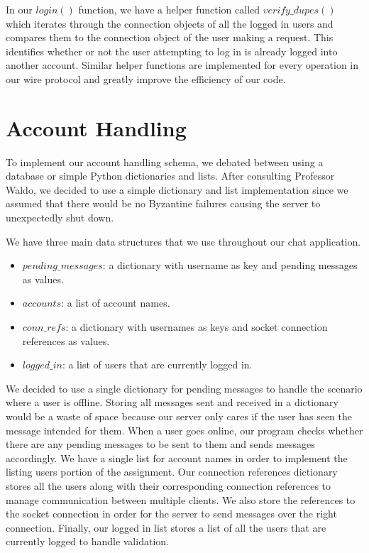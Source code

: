\documentclass[
	a4paper, %
	10pt, %
	unnumberedsections, %
	twoside, %
]{LTJournalArticle}
\begin{document}
In our $login()$ function, we have a helper function called $verify\_dupes()$ which iterates through the connection objects of all the logged in users and compares them to the connection object of the user making a request. This identifies whether or not the user attempting to log in is already logged into another account. Similar helper functions are implemented for every operation in our wire protocol and greatly improve the efficiency of our code. 

\section{Account Handling}

To implement our account handling schema, we debated between using a database or simple Python dictionaries and lists. After consulting Professor Waldo, we decided to use a simple dictionary and list implementation since we assumed that there would be no Byzantine failures causing the server to unexpectedly shut down. 

We have three main data structures that we use throughout our chat application. 
\begin{itemize}
    \item $pending\_messages$: a dictionary with username as key and pending messages as values. 
    \item $accounts$: a list of account names. 
    \item $conn\_refs$: a dictionary with usernames as keys and socket connection references as values.
    \item $logged\_in$: a list of users that are currently logged in. 
\end{itemize}

We decided to use a single dictionary for pending messages to handle the scenario where a user is offline. Storing all messages sent and received in a dictionary would be a waste of space because our server only cares if the user has seen the message intended for them. When a user goes online, our program checks whether there are any pending messages to be sent to them and sends messages accordingly. We have a single list for account names in order to implement the listing users portion of the assignment. Our connection references dictionary stores all the users along with their corresponding connection references to manage communication between multiple clients. We also store the references to the socket connection in order for the server to send messages over the right connection. Finally, our logged in list stores a list of all the users that are currently logged to handle validation. 
\end{document}
